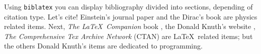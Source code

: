 
Using \texttt{biblatex} you can display bibliography divided into sections, 
depending of citation type. 
Let's cite! Einstein's journal paper \cite{einstein} and the Dirac's 
book \cite{dirac} are physics related items. 
Next, \textit{The \LaTeX\ Companion} book \cite{latexcompanion}, the Donald 
Knuth's website \cite{knuthwebsite}, \textit{The Comprehensive Tex Archive 
Network} (CTAN) \cite{ctan} are \LaTeX\ related items; but the others Donald 
Knuth's items \cite{knuth-fa,knuth-acp} are dedicated to programming. 
